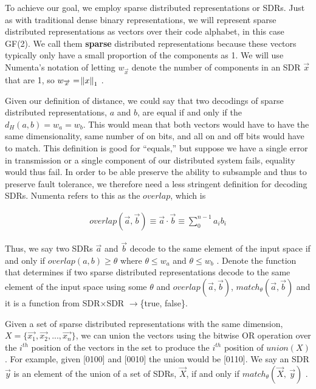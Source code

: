 \documentclass[oneside,12pt,openany]{book}
\begin{document}
	To achieve our goal, we employ sparse distributed representations or SDRs. Just as with traditional dense binary representations, we will represent sparse distributed representations as vectors over their code alphabet, in this case GF(2). We call them \textbf{sparse} distributed representations because these vectors typically only have a small proportion of the components as 1. We will use Numenta's notation of letting $w_{\overrightarrow{x}}$ denote the number of components in an SDR $\overrightarrow{x}$ that are 1, so $w_{\overrightarrow{x}} = \norm{x}_{1}$ \cite{Properties}.
	
	Given our definition of distance, we could say that two decodings of sparse distributed representations, $a$ and $b$, are equal if and only if the $d_{H}(a,b) = w_{a} = w_{b}$. This would mean that both vectors would have to have the same dimensionality, same number of on bits, and all on and off bits would have to match. This definition is good for ``equals,'' but suppose we have a single error in transmission or a single component of our distributed system fails, equality would thus fail. In order to be able preserve the ability to subsample and thus to preserve fault tolerance, we therefore need a less stringent definition for decoding SDRs. Numenta refers to this as the $overlap$, which is 
	
	\begin{align}
	\label{eqn:overlap}
		overlap(\overrightarrow{a}, \overrightarrow{b}) \equiv \overrightarrow{a} \cdot \overrightarrow{b} \equiv \sum_{0}^{n-1} a_{i}b_{i}
	\end{align}
	
	
	 Thus, we say two SDRs $\overrightarrow{a}$ and $\overrightarrow{b}$ decode to the same element of the input space if and only if $overlap(a,b) \geq \theta$ where $\theta \leq w_{a}$ and $\theta \leq w_{b}$ \cite{Properties}. Denote the function that determines if two sparse distributed representations decode to the same element of the input space using some $\theta$ and $overlap(\overrightarrow{a}, \overrightarrow{b})$, $match_{\theta}(\overrightarrow{a}, \overrightarrow{b})$ and it is a function from SDR$\times$SDR $\longrightarrow$\{true, false\}.
	
	Given a set of sparse distributed representations with the same dimension, $X =\{\overrightarrow{x_{1}}, \overrightarrow{x_{2}}, ...,\overrightarrow{x_{n}}\}$, we can union the vectors using the bitwise OR operation over the $i^{th}$ position of the vectors in the set to produce the $i^{th}$ position of $union(X)$ \cite{Properties}. For example, given [0100] and [0010] the union would be [0110]. We say an SDR $\overrightarrow{y}$ is an element of the union of a set of SDRs, $\overrightarrow{X}$, if and only if $match_{\theta}(\overrightarrow{X},\ \overrightarrow{y})$ \cite{Properties}.
	
\end{document}
